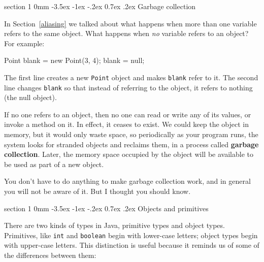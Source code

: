 \documentclass{book}
\makeatletter
\renewcommand{\section}{\@startsection 
    {section} {1} {0mm}%
    {-3.5ex \@plus -1ex \@minus -.2ex}%
    {0.7ex \@plus.2ex}%
    {\normalfont\Large\bfseries}}
\makeatother
\begin{document}
\section {Garbage collection}

In Section~\ref{aliasing} we talked about what happens when
more than one variable refers to the same object.  What happens
when {\em no} variable refers to an object?  For example:

\begin{verbatimtab}
    Point blank = new Point(3, 4);
    blank = null;
\end{verbatimtab}
%
The first line creates a new {\tt Point} object and makes
{\tt blank} refer to it.  The second line changes {\tt blank}
so that instead of referring to the object, it refers to
nothing (the null object).




If no one refers to an object, then no one can read or write any of
its values, or invoke a method on it.  In effect, it ceases to exist.
We could keep the object in memory, but it would only waste space, so
periodically as your program runs, the system looks for stranded
objects and reclaims them, in a process called {\bf garbage
collection}.  Later, the memory space occupied by the object will
be available to be used as part of a new object.

You don't have to do anything to make garbage collection work,
and in general you will not be aware of it.  But I thought you
should know.


\section {Objects and primitives}

There are two kinds of types in Java, primitive types and
object types.  Primitives, like {\tt int} and {\tt boolean}
begin with lower-case letters; object types begin with
upper-case letters.  This distinction is useful because it
reminds us of some of the differences between them:
\end{document}
